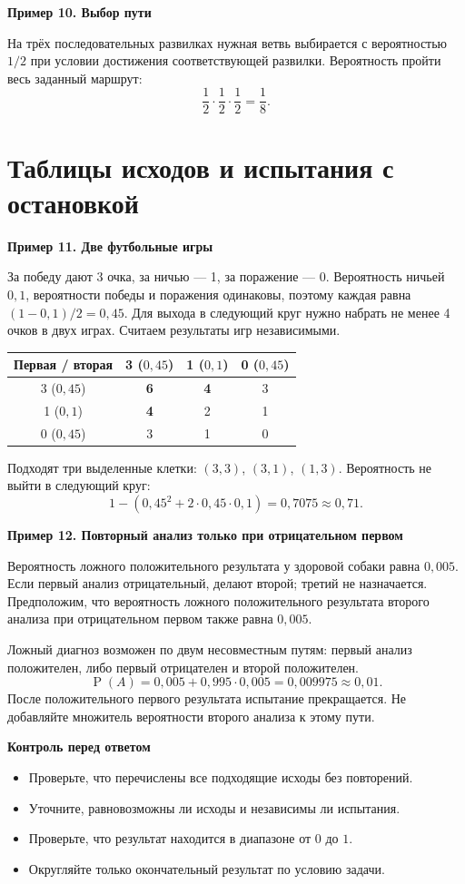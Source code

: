 \documentclass[a4paper,12pt]{article}
\newcommand{\example}[1]{\par\medskip\textcolor{darkaccent}{\textbf{#1}}\par}
\newcommand{\checkitem}{\item[$\square$]}
\newcommand{\prob}{\mathop{\mathrm{P}}}
\begin{document}
\example{Пример 10. Выбор пути}
На трёх последовательных развилках нужная ветвь выбирается с вероятностью $1/2$ при условии достижения соответствующей развилки. Вероятность пройти весь заданный маршрут:
\[ \frac12\cdot\frac12\cdot\frac12=\frac18. \]

\clearpage
\section{Таблицы исходов и испытания с остановкой}
\example{Пример 11. Две футбольные игры}
За победу дают 3 очка, за ничью — 1, за поражение — 0. Вероятность ничьей $0,1$, вероятности победы и поражения одинаковы, поэтому каждая равна $(1-0,1)/2=0,45$. Для выхода в следующий круг нужно набрать не менее 4 очков в двух играх. Считаем результаты игр независимыми.
\begin{center}
\renewcommand{\arraystretch}{1.4}
\begin{tabular}{@{}c c c c@{}}
\toprule
Первая / вторая & 3 ($0,45$) & 1 ($0,1$) & 0 ($0,45$) \\\midrule
3 ($0,45$) & \textcolor{darkaccent}{\textbf{6}} & \textcolor{darkaccent}{\textbf{4}} & 3 \\
1 ($0,1$) & \textcolor{darkaccent}{\textbf{4}} & 2 & 1 \\
0 ($0,45$) & 3 & 1 & 0 \\
\bottomrule
\end{tabular}
\end{center}
Подходят три выделенные клетки: $(3,3)$, $(3,1)$, $(1,3)$. Вероятность не выйти в следующий круг:
\[ 1-(0,45^2+2\cdot0,45\cdot0,1)=0,7075\approx0,71. \]

\example{Пример 12. Повторный анализ только при отрицательном первом}
Вероятность ложного положительного результата у здоровой собаки равна $0,005$. Если первый анализ отрицательный, делают второй; третий не назначается. Предположим, что вероятность ложного положительного результата второго анализа при отрицательном первом также равна $0,005$.

Ложный диагноз возможен по двум несовместным путям: первый анализ положителен, либо первый отрицателен и второй положителен.
\[ \prob(A)=0,005+0,995\cdot0,005=0,009975\approx0,01. \]
После положительного первого результата испытание прекращается. Не добавляйте множитель вероятности второго анализа к этому пути.

\textcolor{darkaccent}{\textbf{Контроль перед ответом}}
\begin{itemize}
\checkitem Проверьте, что перечислены все подходящие исходы без повторений.
\checkitem Уточните, равновозможны ли исходы и независимы ли испытания.
\checkitem Проверьте, что результат находится в диапазоне от $0$ до $1$.
\checkitem Округляйте только окончательный результат по условию задачи.
\end{itemize}
\end{document}
